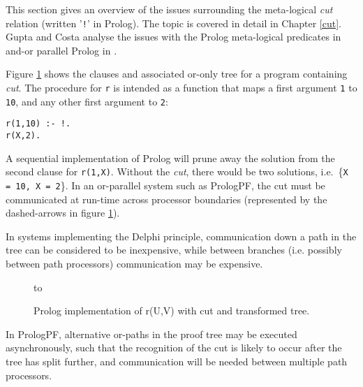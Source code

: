 This section gives an overview of the issues surrounding the meta-logical \textit{cut}
relation (written '\texttt{!}' in Prolog).  The topic is covered in detail in
Chapter \ref{cut}.  Gupta and Costa analyse the issues with the Prolog meta-logical
predicates in and-or parallel Prolog in \cite{GSC92}.

Figure \ref{cut_tree} shows the clauses and associated or-only tree for a 
program containing \textit{cut}.  The procedure for \texttt{r} is intended as
a function that maps a first argument
 \texttt{1} to \texttt{10}, and any other first argument
to \texttt{2}:
\begin{verbatim}
r(1,10) :- !.
r(X,2).
\end{verbatim}

A sequential implementation of Prolog will prune away
the solution from the second clause
for \texttt{r(1,X)}.  Without the \textit{cut}, there
would be two solutions, i.e.\ \{\texttt{X = 10, X = 2}\}.
In an or-parallel system such as PrologPF, the cut must be
communicated at run-time
across processor boundaries (represented by the dashed-arrows in
figure \ref{cut_tree}).

In systems implementing the Delphi principle, communication down
a path in the tree can be considered to be inexpensive, while between branches
(i.e. possibly between path processors) communication may be expensive.

\begin{figure}[h]
\vspace{5mm} \hbox to 
\caption{Prolog implementation of r(U,V) with cut and transformed tree.}
\vspace{5mm}
\label{cut_tree}
\end{figure}

In PrologPF, alternative or-paths in the proof tree may be executed asynchronously, such
that the recognition of the cut is likely to occur after the tree has split further, and
communication will be needed between multiple path processors.

